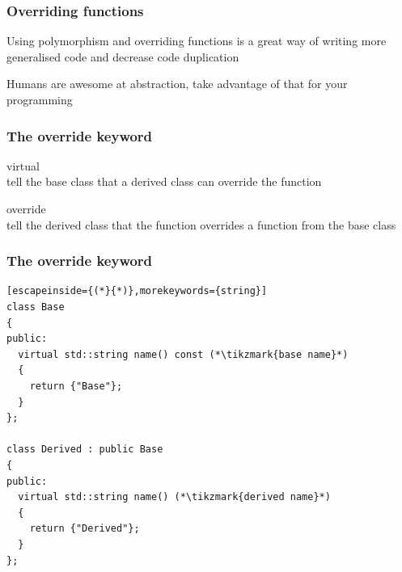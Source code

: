 \documentclass[14pt,a4paper,dvipsnames,usenames]{beamer}
\begin{document}
\begin{frame}[fragile]
  \frametitle{Overriding functions}

  Using polymorphism and overriding functions is a great way of writing more generalised code
  and decrease code duplication

  \vspace{1cm}
  Humans are awesome at abstraction, take advantage of that for your programming
  
\end{frame}

\begin{frame}[fragile]
  \frametitle{The {\color{FeebleWeek}override} keyword}

  {\color{FeebleWeek}virtual}\\[2pt]
  tell the base class that a derived class can override the function

  \vspace*{-.5cm}
  \begin{center}
  \end{center}

  \vspace*{-.5cm}
  {\color{FeebleWeek}override}\\[2pt]
  tell the derived class that the function overrides a function from the base class

  \CPPEleven
  
\end{frame}

\begin{frame}[fragile]
  \frametitle{The {\color{FeebleWeek}override} keyword}

  \begin{lstlisting}[escapeinside={(*}{*)},morekeywords={string}]
class Base
{
public:
  virtual std::string name() const (*\tikzmark{base name}*)
  {
    return {"Base"};
  }
};

class Derived : public Base
{
public:
  virtual std::string name() (*\tikzmark{derived name}*)
  {
    return {"Derived"};
  }
};
  \end{lstlisting}


  \CPPEleven
  
\end{frame}
\end{document}
